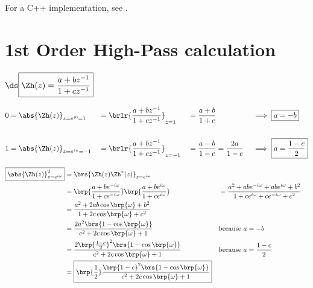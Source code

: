 For a C++ implementation, see .

\section{1st Order High-Pass calculation}
$\ds\boxed{ \Zh(z) = \frac{a + bz^{-1}}
                        {1 + cz^{-1}}
          }$

\begin{align*}
  0 &= {\abs{\Zh(z)}}_{z=e^{i0}=1}    
    &&=\brlr{\frac{a + bz^{-1}}{1 + cz^{-1}}}_{z=1} 
    &&=\frac{a + b}{1 + c}                   
    && \implies \boxed{a=-b}
  \\\\
  1 &= \abs{\Zh(z)}_{z=e^{i\pi}=-1} 
   &&= \brlr{\frac{a + bz^{-1}}{1 + cz^{-1}}}_{z=-1} 
   &&= \frac{a - b}{1 - c} = \frac{2a}{1-c}                   
   &&  \implies \boxed{a=\frac{1-c}{2}}
\end{align*}


%
\begin{align*}
  \boxed{\abs{\Zh(z)}^2_{z=e^{i\omega}}}
    &= \brs{\Zh(z)\Zh^\ast(z)}_{z=e^{i\omega}}
  \\&= \brp{\frac{a + be^{-i\omega}}{1 + ce^{-i\omega}}}
       \brp{\frac{a + be^{i\omega}}{1 + ce^{i\omega}}}
   &&= \frac{a^2 + abe^{-i\omega} + abe^{i\omega} + b^2}
            {1   +  ce^{i\omega} +  ce^{-i\omega} + c^2}
  \\&= \frac{a^2 + 2ab\cos\brp{\omega} + b^2}
            {1   + 2 c\cos\brp{\omega} + c^2}
  \\&= \frac{2a^2\brs{1 -  \cos\brp{\omega}}}
            {c^2 + 2 c\cos\brp{\omega} + 1}
    && \text{because $a=-b$}
  \\&= \frac{2\brp{\frac{1-c}{2}}^2\brs{1 -  \cos\brp{\omega}}}
            {c^2 + 2 c\cos\brp{\omega} + 1}
    && \text{because $a=\frac{1-c}{2}$}
  \\&= \boxed{\brp{\frac{1}{2}}
              \frac{\brp{1-c}^2\brs{1 -  \cos\brp{\omega}}}
                   {c^2 + 2 c\cos\brp{\omega} + 1}
             }
\end{align*}

